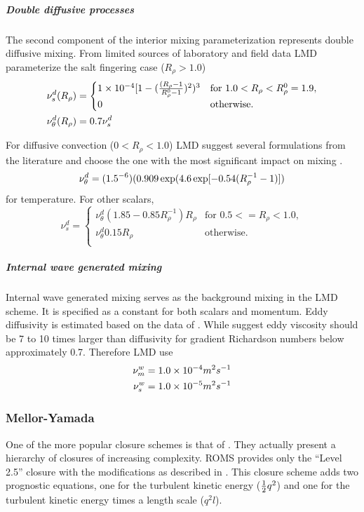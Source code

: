 \subparagraph{Double diffusive processes}
The second component of the interior mixing parameterization represents
double diffusive mixing.  From limited sources of laboratory and field
data LMD parameterize the salt fingering case ($R_{\rho}>1.0$)
\begin{align}
\nu_{s}^{d}(R_{\rho}) & =
	\begin{cases}
      1\times10^{-4}[1-(\frac{(R_{\rho}-1}{R_{\rho}^0-1})^2)^{3}&
      \text{for $1.0<R_{\rho}<R_{\rho}^0=1.9$},\\
           0& \text{otherwise}.
        \end{cases}
\\ \vspace{1mm}
\nu_{\theta}^{d}(R_{\rho}) & =0.7\nu_{s}^{d}
\end{align}

For diffusive convection ($0<R_{\rho}<1.0$) LMD suggest several
formulations from the literature and choose the one with the most
significant impact on mixing \citep{Fedorov88}.
\begin{equation}
\nu_{\theta}^{d}=(1.5 \time 10^{-6})(0.909 \exp(4.6 \exp[-0.54(R_{\rho}^{-1}-1)])
\end{equation}
for temperature.  For other scalars,
\begin{equation}
   \nu_{s}^{d}=
	\begin{cases}
	     \nu_{\theta}^{d}(1.85-0.85R_{\rho}^{-1})R_{\rho}& \text{for $0.5<=R_{\rho}<1.0$},\\ 
             \nu_{\theta}^{d}0.15R_{\rho}&  \text{otherwise}. \\
        \end{cases}
\end{equation}

\subparagraph{Internal wave generated mixing}
Internal wave generated mixing serves as the background mixing in the
LMD scheme.  It is specified as a constant for both scalars and
momentum.  Eddy diffusivity is estimated based on the data of
\citet{LWL93}.  While \citet{Peters88} suggest
eddy viscosity should be 7 to 10 times larger than diffusivity for
gradient Richardson numbers below approximately 0.7.  Therefore LMD use
\begin{align}
\nu_{m}^w & =1.0 \times 10^{-4} m^2 s^{-1}
\\ \vspace{1mm}
\nu_{s}^w & =1.0 \times 10^{-5} m^2 s^{-1}
\end{align}

\subsubsection{Mellor-Yamada}
\label{sec:MY25}
One of the more popular closure schemes is that of
\citet{Mellor74, Mellor82}. They actually present a hierarchy of
closures of increasing complexity. ROMS provides only the
``Level 2.5'' closure with the \citet{Galperin88}
modifications as described in \citet{Allen95}.
This closure scheme adds two prognostic equations, one
for the turbulent kinetic energy (${1 \over 2} q^2$) and one for the
turbulent kinetic energy times a length scale ($q^2l$).

